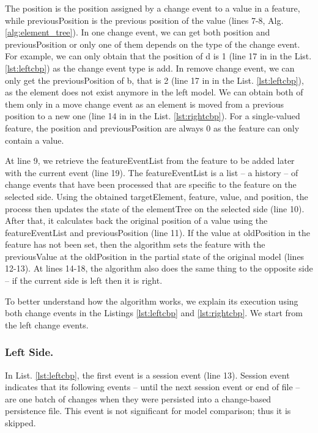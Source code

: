 \documentclass{jot}
\begin{document}
The \textsf{position} is the position assigned by a change event to a value in a feature, while \textsf{previousPosition} is the previous position of the value (lines 7-8, Alg. \ref{alg:element_tree}). In one change event, we can get both \textsf{position} and \textsf{previousPosition} or only one of them depends on the type of the change event. For example, we can only obtain that the \textsf{position} of \textsf{d} is 1 (line 17 in in the List. \ref{lst:leftcbp}) as the change event type is \textsf{add}. In \textsf{remove} change event, we can only get the \textsf{previousPosition} of \textsf{b}, that is 2 (line 17 in in the List. \ref{lst:leftcbp}), as the element does not exist anymore in the left model. We can obtain both of them only in a \textsf{move} change event as an element is moved from a previous position to a new one (line 14 in in the List. \ref{lst:rightcbp}). For a single-valued feature, the \textsf{position} and \textsf{previousPosition} are always 0 as the feature can only contain a value. 

At line 9, we retrieve the \textsf{featureEventList} from the \textsf{feature} to be added later with the current \textsf{event} (line 19). The \textsf{featureEventList} is a list -- a history -- of change events that have been processed that are specific to the \textsf{feature} on the selected \textsf{side}. Using the obtained \textsf{targetElement}, \textsf{feature}, \textsf{value}, and \textsf{position}, the process then updates the state of the \textsf{elementTree} on the selected \textsf{side} (line 10). After that, it calculates back the original position of a value using the \textsf{featureEventList} and \textsf{previousPosition} (line 11). If the value at \textsf{oldPosition} in the \textsf{feature} has not been set, then the algorithm sets the \textsf{feature} with the \textsf{previousValue} at the \textsf{oldPosition} in the partial state of the original model (lines 12-13). At lines 14-18, the algorithm also does the same thing to the opposite side -- if the current \textsf{side} is \textsf{left} then it is \textsf{right}.  

To better understand how the algorithm works, we explain its execution using both change events in the Listings \ref{lst:leftcbp} and \ref{lst:rightcbp}. We start from the left change events. 

\vspace{-10pt}
\subsubsection{Left Side.}\label{sec:left_side} In List. \ref{lst:leftcbp}, the first event is a \textsf{session} event (line 13). \textsf{Session} event indicates that its following events -- until the next session event or end of file -- are one batch of changes when they were persisted into a change-based persistence file. This event is not significant for model comparison; thus it is skipped. 
\end{document}
